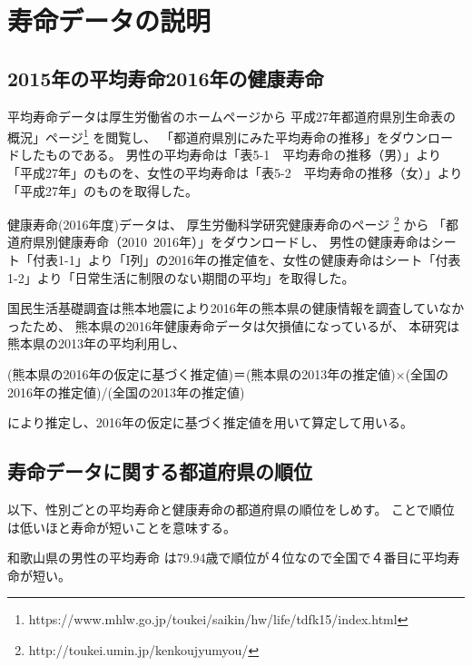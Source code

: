 \chapter{寿命データの説明}

\section{2015年の平均寿命2016年の健康寿命}


平均寿命データは厚生労働省のホームページから
平成27年都道府県別生命表の概況」ページ\footnote{https://www.mhlw.go.jp/toukei/saikin/hw/life/tdfk15/index.html}
を閲覧し、
「都道府県別にみた平均寿命の推移」をダウンロードしたものである。
男性の平均寿命は「表5-1　平均寿命の推移（男）」より「平成27年」のものを、女性の平均寿命は「表5-2　平均寿命の推移（女）」より「平成27年」のものを取得した。


健康寿命(2016年度)データは、
厚生労働科学研究健康寿命のページ
\footnote{http://toukei.umin.jp/kenkoujyumyou/}
から
「都道府県別健康寿命（2010~2016年）」をダウンロードし、
男性の健康寿命はシート「付表1-1」より「I列」の2016年の推定値を、女性の健康寿命はシート「付表1-2」より「日常生活に制限のない期間の平均」を取得した。

国民生活基礎調査は熊本地震により2016年の熊本県の健康情報を調査していなかったため、
熊本県の2016年健康寿命データは欠損値になっているが、
本研究は熊本県の2013年の平均利用し、

\begin{center}
	(熊本県の2016年の仮定に基づく推定値)＝(熊本県の2013年の推定値)×(全国の2016年の推定値)/(全国の2013年の推定値)
\end{center}

により推定し、2016年の仮定に基づく推定値を用いて算定して用いる。




\newpage

\section{寿命データに関する都道府県の順位}

以下、性別ごとの平均寿命と健康寿命の都道府県の順位をしめす。
ことで順位は低いほと寿命が短いことを意味する。

和歌山県の男性の平均寿命
は79.94歳で順位が４位なので全国で４番目に平均寿命が短い。








